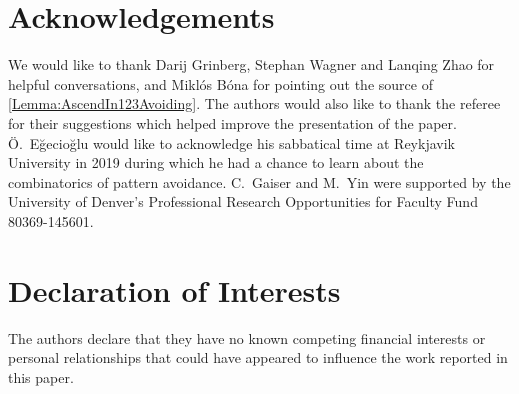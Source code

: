 \documentclass[11pt]{article}
\theoremstyle{definition}
\numberwithin{equation}{section}
\begin{document}
\section*{Acknowledgements}

We would like to thank Darij Grinberg, Stephan Wagner and Lanqing Zhao for helpful conversations, and Mikl\'{o}s B\'{o}na for pointing out the source of \cref{Lemma:AscendIn123Avoiding}. The authors would also like to thank the referee for their suggestions which helped improve the presentation of the paper. \"O.~E\u{g}ecio\u{g}lu 
would like to acknowledge his sabbatical time at Reykjavik University in 2019 during which he 
had a chance to learn about the combinatorics of pattern avoidance. C.~Gaiser and M.~Yin were supported by the University of Denver's Professional 
Research Opportunities for Faculty Fund 80369-145601.


\section*{Declaration of Interests}

The authors declare that they have no known competing financial interests or personal relationships that could have appeared to influence the work reported in this paper.


\end{document}
